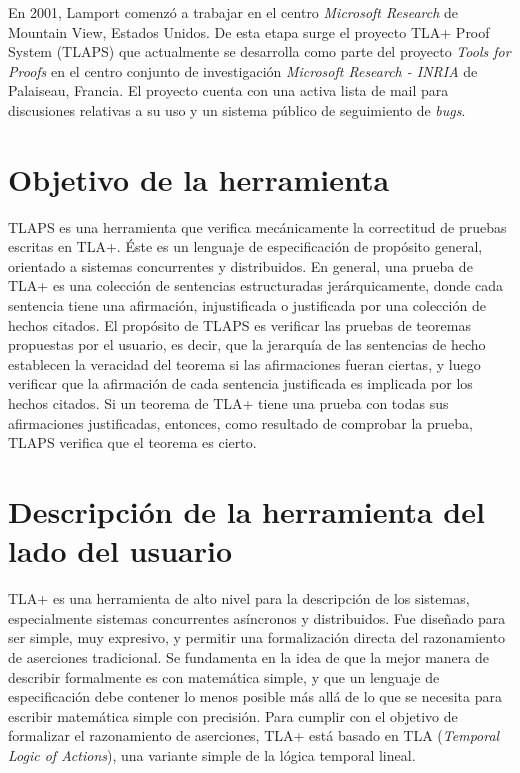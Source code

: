 \documentclass[spanish]{llncs}
\begin{document}
En 2001, Lamport comenzó a trabajar en el centro \textit{Microsoft Research} de Mountain View, Estados Unidos. De esta etapa surge el proyecto TLA+ Proof System (TLAPS) que actualmente se desarrolla como parte del proyecto \textit{Tools for Proofs} en el centro conjunto de investigación \textit{Microsoft Research - INRIA} de Palaiseau, Francia. El proyecto cuenta con una activa lista de mail para discusiones relativas a su uso y un sistema público de seguimiento de \textit{bugs}.



\section{Objetivo de la herramienta}

TLAPS es una herramienta que verifica mecánicamente la correctitud de pruebas escritas en TLA+.
Éste es un lenguaje de especificación de propósito general, orientado a sistemas concurrentes y distribuidos.\cite{highlevel}
En general, una prueba de TLA+ es una colección de sentencias estructuradas jerárquicamente,
donde cada sentencia tiene una afirmación, injustificada o justificada por una colección de hechos citados.
El propósito de TLAPS es verificar las pruebas de teoremas propuestas por el usuario, es decir,
que la jerarquía de las sentencias de hecho establecen la veracidad del teorema si las afirmaciones fueran ciertas,
y luego verificar que la afirmación de cada sentencia justificada es implicada por los hechos citados.\cite{tlaps}
Si un teorema de TLA+ tiene una prueba con todas sus afirmaciones justificadas, entonces, como resultado
de comprobar la prueba, TLAPS verifica que el teorema es cierto.

\section{Descripción de la herramienta del lado del usuario}

TLA+ es una herramienta de alto nivel para la descripción de los sistemas, especialmente sistemas concurrentes asíncronos y distribuidos. 
Fue diseñado para ser simple, muy expresivo, y permitir una formalización directa del razonamiento de aserciones tradicional.
Se fundamenta en la idea de que la mejor manera de describir formalmente es con matemática simple, y que un lenguaje de especificación debe contener lo menos posible más allá de lo que se necesita para escribir matemática simple con precisión.
Para cumplir con el objetivo de formalizar el razonamiento de aserciones, TLA+ está basado en TLA (\textit{Temporal Logic of Actions}), una variante simple de la lógica temporal lineal.
\end{document}
